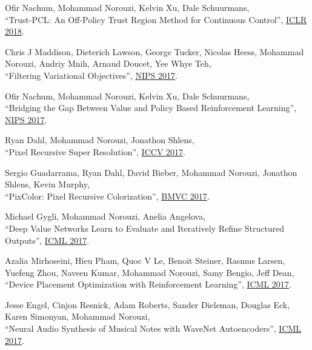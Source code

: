 \documentclass[10pt,letterpaper]{article}
\renewenvironment{itemize}{
  \begin{list}{}{
    \setlength{\leftmargin}{1.5em}
  }
}{
  \end{list}
}
\begin{document}
\begin{itemize}
\item Ofir Nachum, Mohammad Norouzi, Kelvin Xu, Dale Schuurmans,\\
``Trust-PCL: An Off-Policy Trust Region Method for Continuous Control'',
\href{https://arxiv.org/pdf/1707.01891}%
{ICLR 2018}.

\item Chris J Maddison, Dieterich Lawson, George Tucker, Nicolas Heess, Mohammad Norouzi, Andriy Mnih, Arnaud Doucet, Yee Whye Teh,\\
``Filtering Variational Objectives'',
\href{https://arxiv.org/pdf/1705.09279}%
{NIPS 2017}.

\item Ofir Nachum, Mohammad Norouzi, Kelvin Xu, Dale Schuurmans,\\
``Bridging the Gap Between Value and Policy Based Reinforcement Learning'',
\href{https://arxiv.org/pdf/1702.08892}%
{NIPS 2017}.

\item Ryan Dahl, Mohammad Norouzi, Jonathon Shlens,\\
``Pixel Recursive Super Resolution'',
\href{https://arxiv.org/pdf/1702.00783}%
{ICCV 2017}.

\item Sergio Guadarrama, Ryan Dahl, David Bieber, Mohammad Norouzi, Jonathon Shlens, Kevin Murphy,\\
``PixColor: Pixel Recursive Colorization'',
\href{https://arxiv.org/pdf/1705.07208}%
{BMVC 2017}.

\item Michael Gygli, Mohammad Norouzi, Anelia Angelova,\\
``Deep Value Networks Learn to Evaluate and Iteratively Refine Structured Outputs'',
\href{https://arxiv.org/pdf/1703.04363}%
{ICML 2017}.

\item Azalia Mirhoseini, Hieu Pham, Quoc V Le, Benoit Steiner, Rasmus Larsen, Yuefeng Zhou, Naveen Kumar, Mohammad Norouzi, Samy Bengio, Jeff Dean,\\
``Device Placement Optimization with Reinforcement Learning'',
\href{https://arxiv.org/pdf/1706.04972.pdf}%
{ICML 2017}.

\item Jesse Engel, Cinjon Resnick, Adam Roberts, Sander Dieleman, Douglas Eck, Karen Simonyan, Mohammad Norouzi,\\
``Neural Audio Synthesis of Musical Notes with WaveNet Autoencoders'',
\href{https://arxiv.org/pdf/1704.01279}%
{ICML 2017}.


\end{itemize}
\end{document}
